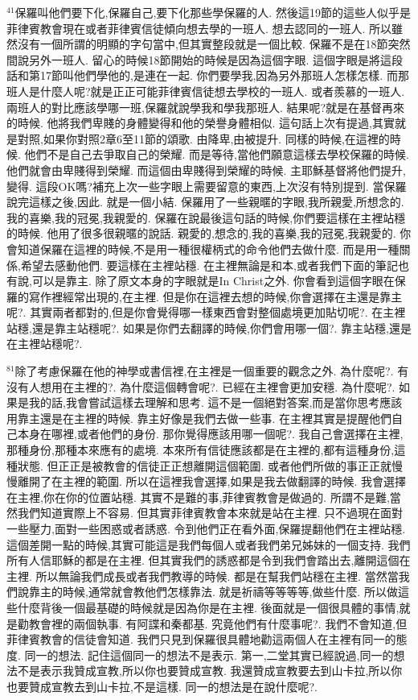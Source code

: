\documentclass{book}
\begin{document}
$^{41}$保羅叫他們要下化,保羅自己,要下化那些學保羅的人.
然後這19節的這些人似乎是菲律賓教會現在或者菲律賓信徒傾向想去學的一班人.
想去認同的一班人.
所以雖然沒有一個所謂的明顯的字句當中,但其實整段就是一個比較.
保羅不是在18節突然間說另外一班人.
留心的時候18節開始的時候是因為這個字眼.
這個字眼是將這段話和第17節叫他們學他的,是連在一起.
你們要學我,因為另外那班人怎樣怎樣.
而那班人是什麼人呢?就是正正可能菲律賓信徒想去學校的一班人.
或者羨慕的一班人.
兩班人的對比應該學哪一班,保羅就說學我和學我那班人.
結果呢?就是在基督再來的時候.
他將我們卑賤的身體變得和他的榮譽身體相似.
這句話上次有提過,其實就是對照,如果你對照2章6至11節的頌歌.
由降卑,由被提升.
同樣的時候,在這裡的時候.
他們不是自己去爭取自己的榮耀.
而是等待,當他們願意這樣去學校保羅的時候.
他們就會由卑賤得到榮耀.
而這個由卑賤得到榮耀的時候.
主耶穌基督將他們提升,變得.
這段OK嗎?補充上次一些字眼上需要留意的東西,上次沒有特別提到.
當保羅說完這樣之後,因此.
就是一個小結.
保羅用了一些親暱的字眼,我所親愛,所想念的.
我的喜樂,我的冠冕,我親愛的.
保羅在說最後這句話的時候,你們要這樣在主裡站穩的時候.
他用了很多很親暱的說話.
親愛的,想念的,我的喜樂,我的冠冕,我親愛的.
你會知道保羅在這裡的時候,不是用一種很權柄式的命令他們去做什麼.
而是用一種關係,希望去感動他們.
要這樣在主裡站穩.
在主裡無論是和本,或者我們下面的筆記也有說,可以是靠主.
除了原文本身的字眼就是In Christ之外.
你會看到這個字眼在保羅的寫作裡經常出現的,在主裡.
但是你在這裡去想的時候,你會選擇在主還是靠主呢?.
其實兩者都對的,但是你會覺得哪一樣東西會對整個處境更加貼切呢?.
在主裡站穩,還是靠主站穩呢?.
如果是你們去翻譯的時候,你們會用哪一個?.
靠主站穩,還是在主裡站穩呢?.

$^{81}$除了考慮保羅在他的神學或書信裡,在主裡是一個重要的觀念之外.
為什麼呢?.
有沒有人想用在主裡的?.
為什麼這個轉會呢?.
已經在主裡會更加安穩.
為什麼呢?.
如果是我的話,我會嘗試這樣去理解和思考.
這不是一個絕對答案,而是當你思考應該用靠主還是在主裡的時候.
靠主好像是我們去做一些事.
在主裡其實是提醒他們自己本身在哪裡,或者他們的身份.
那你覺得應該用哪一個呢?.
我自己會選擇在主裡,那種身份,那種本來應有的處境.
本來所有信徒應該都是在主裡的,都有這種身份,這種狀態.
但正正是被教會的信徒正正想離開這個範圍.
或者他們所做的事正正就慢慢離開了在主裡的範圍.
所以在這裡我會選擇,如果是我去做翻譯的時候.
我會選擇在主裡,你在你的位置站穩.
其實不是難的事,菲律賓教會是做過的.
所謂不是難,當然我們知道實際上不容易.
但其實菲律賓教會本來就是站在主裡.
只不過現在面對一些壓力,面對一些困惑或者誘惑.
令到他們正在看外面,保羅提翻他們在主裡站穩.
這個差開一點的時候,其實可能這是我們每個人或者我們弟兄姊妹的一個支持.
我們所有人信耶穌的都是在主裡.
但其實我們的誘惑都是令到我們會踏出去,離開這個在主裡.
所以無論我們成長或者我們教導的時候.
都是在幫我們站穩在主裡.
當然當我們說靠主的時候,通常就會教他們怎樣靠法.
就是祈禱等等等等,做些什麼.
所以做這些什麼背後一個最基礎的時候就是因為你是在主裡.
後面就是一個很具體的事情,就是勸教會裡的兩個執事.
有阿諜和秦都基.
究竟他們有什麼事呢?.
我們不會知道,但菲律賓教會的信徒會知道.
我們只見到保羅很具體地勸這兩個人在主裡有同一的態度.
同一的想法.
記住這個同一的想法不是表示.
第一,二堂其實已經說過,同一的想法不是表示我贊成宣教,所以你也要贊成宣教.
我還贊成宣教要去到山卡拉,所以你也要贊成宣教去到山卡拉,不是這樣.
同一的想法是在說什麼呢?.
\end{document}
